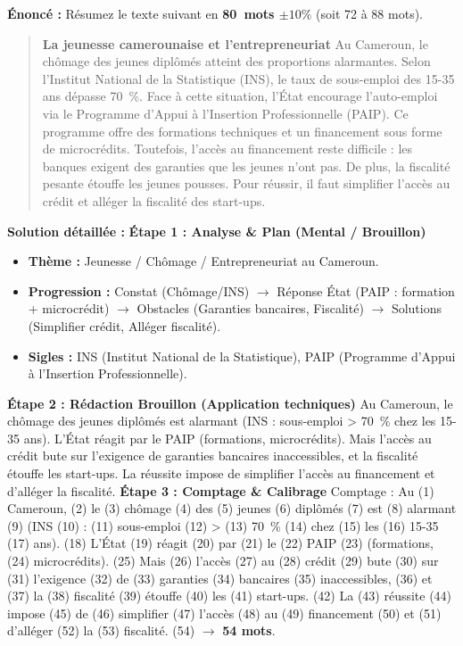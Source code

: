 \documentclass[11pt]{article}
\begin{document}
\begin{exoresolu}
\textbf{Énoncé :} Résumez le texte suivant en \textbf{80~mots $\pm 10\%$} (soit 72 à 88 mots).
\begin{quote}
\textbf{La jeunesse camerounaise et l'entrepreneuriat}
\og Au Cameroun, le chômage des jeunes diplômés atteint des proportions alarmantes. Selon l'Institut National de la Statistique (INS), le taux de sous-emploi des 15-35 ans dépasse 70~\%. Face à cette situation, l'État encourage l'auto-emploi via le Programme d'Appui à l'Insertion Professionnelle (PAIP). Ce programme offre des formations techniques et un financement sous forme de microcrédits. Toutefois, l'accès au financement reste difficile : les banques exigent des garanties que les jeunes n'ont pas. De plus, la fiscalité pesante étouffe les jeunes pousses. Pour réussir, il faut simplifier l'accès au crédit et alléger la fiscalité des start-ups. \fg
\end{quote}
\tcblower
\textbf{Solution détaillée :}
\textbf{Étape 1 : Analyse \& Plan (Mental / Brouillon)}
\begin{itemize}
    \item \textbf{Thème :} Jeunesse / Chômage / Entrepreneuriat au Cameroun.
    \item \textbf{Progression :} Constat (Chômage/INS) $\rightarrow$ Réponse État (PAIP : formation + microcrédit) $\rightarrow$ Obstacles (Garanties bancaires, Fiscalité) $\rightarrow$ Solutions (Simplifier crédit, Alléger fiscalité).
    \item \textbf{Sigles :} INS (Institut National de la Statistique), PAIP (Programme d'Appui à l'Insertion Professionnelle).
\end{itemize}
\textbf{Étape 2 : Rédaction Brouillon (Application techniques)}
\og Au Cameroun, le chômage des jeunes diplômés est alarmant (INS : sous-emploi > 70~\% chez les 15-35 ans). L'État réagit par le PAIP (formations, microcrédits). Mais l'accès au crédit bute sur l'exigence de garanties bancaires inaccessibles, et la fiscalité étouffe les start-ups. La réussite impose de simplifier l'accès au financement et d'alléger la fiscalité. \fg
\textbf{Étape 3 : Comptage \& Calibrage}
Comptage : \og Au (1) Cameroun, (2) le (3) chômage (4) des (5) jeunes (6) diplômés (7) est (8) alarmant (9) (INS (10) : (11) sous-emploi (12) > (13) 70~\% (14) chez (15) les (16) 15-35 (17) ans). (18) L'État (19) réagit (20) par (21) le (22) PAIP (23) (formations, (24) microcrédits). (25) Mais (26) l'accès (27) au (28) crédit (29) bute (30) sur (31) l'exigence (32) de (33) garanties (34) bancaires (35) inaccessibles, (36) et (37) la (38) fiscalité (39) étouffe (40) les (41) start-ups. (42) La (43) réussite (44) impose (45) de (46) simplifier (47) l'accès (48) au (49) financement (50) et (51) d'alléger (52) la (53) fiscalité. (54) \fg{} $\rightarrow$ \textbf{54 mots}.

\end{exoresolu}
\end{document}
